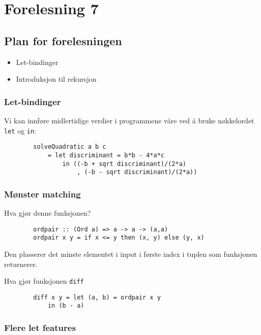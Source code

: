 \documentclass{article}
\begin{document}
    \section{Forelesning 7}

    \subsection{Plan for forelesningen}
    \begin{itemize}
        \item Let-bindinger
        \item Introduksjon til rekursjon
    \end{itemize}

    \subsubsection{Let-bindinger}

    Vi kan innføre midlertidige verdier i programmene våre ved å bruke nøkkelordet \texttt{let} og \texttt{in}:

    \begin{lstlisting}
        solveQuadratic a b c
            = let discriminant = b*b - 4*a*c 
                in ((-b + sqrt discriminant)/(2*a)
                    , (-b - sqrt discriminant)/(2*a))
    \end{lstlisting}

    \subsubsection{Mønster matching}
    Hva gjør denne funksjonen?
    \begin{lstlisting}
        ordpair :: (Ord a) => a -> a -> (a,a)
        ordpair x y = if x <= y then (x, y) else (y, x)
    \end{lstlisting}

    Den plasserer det minste elementet i input i første index i tuplen som funksjonen returnerer.
    \medskip

    Hva gjør funksjonen \texttt{diff}

    \begin{lstlisting}
        diff x y = let (a, b) = ordpair x y
            in (b - a)
    \end{lstlisting}


    \subsubsection{Flere let features}
\end{document}
